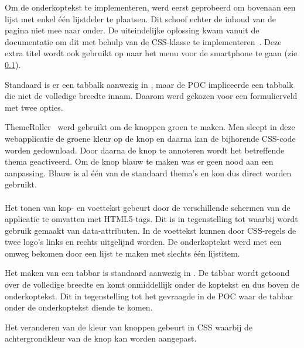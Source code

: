 Om de onderkoptekst te implementeren, werd eerst geprobeerd om bovenaan een lijst met enkel één lijstdeler te plaatsen.
Dit schoof echter de inhoud van de pagina niet mee naar onder. 
De uiteindelijke oplossing kwam vanuit de documentatie om dit met behulp van de CSS-klasse  te implementeren~\cite{JQuery2013b}. 
Deze extra titel wordt ook gebruikt op naar het menu voor de smartphone te gaan (zie \ref{sec:evaluatie-gebruik-toestel}).

Standaard is er een tabbalk aanwezig in \jqm, maar de POC impliceerde een tabbalk die niet de volledige breedte innam.
Daarom werd gekozen voor een formulierveld met twee opties.

ThemeRoller~\cite{JQuery2012c} werd gebruikt om de knoppen groen te maken.
Men sleept in deze webapplicatie de groene kleur op de knop en daarna kan de bijhorende CSS-code worden gedownload. 
Door daarna de knop te annoteren wordt het betreffende thema geactiveerd. 
Om de knop blauw te maken was er geen nood aan een aanpassing.
Blauw is al één van de standaard thema's en kon dus direct worden gebruikt.

\paragraph{\lungo}
Het tonen van kop- en voettekst gebeurt door de verschillende schermen van de applicatie te omvatten met HTML5-tags.
Dit is in tegenstelling tot \jqm{} waarbij wordt gebruik gemaakt van data-attributen.
In de voettekst kunnen door CSS-regels de twee logo's links en rechts uitgelijnd worden.
De onderkoptekst werd met een omweg bekomen door een lijst te maken met slechts één lijstitem.

Het maken van een tabbar is standaard aanwezig in \lungo{}.
De tabbar wordt getoond over de volledige breedte en komt onmiddellijk onder de koptekst en dus boven de onderkoptekst.
Dit in tegenstelling tot het gevraagde in de POC waar de tabbar onder de onderkoptekst diende te komen.

Het veranderen van de kleur van knoppen gebeurt in CSS waarbij de achtergrondkleur van de knop kan worden aangepast.


\subsection{}
\label{sec:evaluatie-gebruik-toestel}

